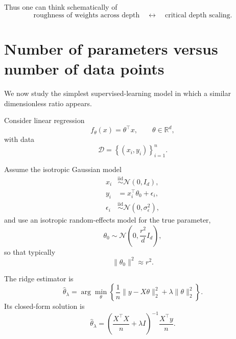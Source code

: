 Thus one can think schematically of
\begin{equation}
    \boxed{
    \text{roughness of weights across depth}
    \quad\leftrightarrow\quad
    \text{critical depth scaling}.
    }
\end{equation}


\section{Number of parameters versus number of data points}

We now study the simplest supervised-learning model in which a
similar dimensionless ratio appears.

Consider linear regression
\begin{equation}
    f_\theta(x)
    =
    \theta^\top x,
    \qquad
    \theta\in\mathbb{R}^d,
\end{equation}
with data
\begin{equation}
    \mathcal{D}
    =
    \left\{
        (x_i,y_i)
    \right\}_{i=1}^n.
\end{equation}

Assume the isotropic Gaussian model
\begin{align}
    x_i
    &\overset{\mathrm{iid}}{\sim}
    \mathcal{N}(0,I_d),
    \\
    y_i
    &=
    x_i^\top\theta_0+\epsilon_i,
    \\
    \epsilon_i
    &\overset{\mathrm{iid}}{\sim}
    \mathcal{N}(0,\sigma_\epsilon^2),
\end{align}
and use an isotropic random-effects model for the true parameter,
\begin{equation}
    \theta_0
    \sim
    \mathcal{N}
    \left(
        0,\frac{r^2}{d}I_d
    \right),
\end{equation}
so that typically
\[
\|\theta_0\|^2\approx r^2.
\]

The ridge estimator is
\begin{equation}
    \widehat{\theta}_\lambda
    =
    \arg\min_{\theta}
    \left\{
        \frac{1}{n}
        \|y-X\theta\|_2^2
        +
        \lambda\|\theta\|_2^2
    \right\}.
\end{equation}
Its closed-form solution is
\begin{equation}
    \boxed{
    \widehat{\theta}_\lambda
    =
    \left(
        \frac{X^\top X}{n}
        +
        \lambda I
    \right)^{-1}
    \frac{X^\top y}{n}.
    }
\end{equation}

